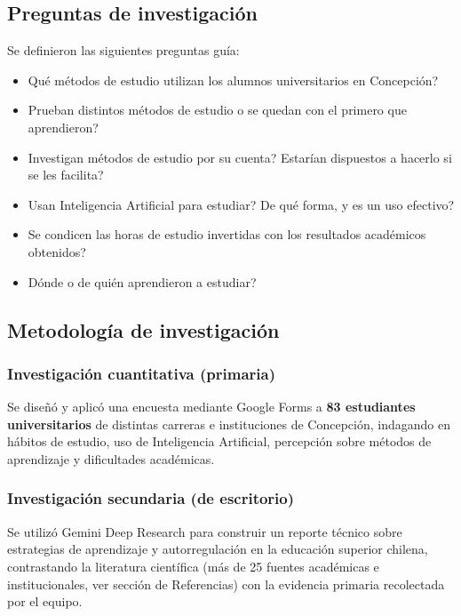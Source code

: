 \documentclass[11pt,a4paper]{article}
\begin{document}
\subsection{Preguntas de investigaci\'on}

Se definieron las siguientes preguntas gu\'ia:
\begin{itemize}[itemsep=1pt]
\item \textquestiondown Qu\'e m\'etodos de estudio utilizan los alumnos universitarios en Concepci\'on?
\item \textquestiondown Prueban distintos m\'etodos de estudio o se quedan con el primero que aprendieron?
\item \textquestiondown Investigan m\'etodos de estudio por su cuenta? \textquestiondown Estar\'ian dispuestos a hacerlo si se les facilita?
\item \textquestiondown Usan Inteligencia Artificial para estudiar? \textquestiondown De qu\'e forma, y es un uso efectivo?
\item \textquestiondown Se condicen las horas de estudio invertidas con los resultados acad\'emicos obtenidos?
\item \textquestiondown D\'onde o de qui\'en aprendieron a estudiar?
\end{itemize}

\subsection{Metodolog\'ia de investigaci\'on}

\subsubsection{Investigaci\'on cuantitativa (primaria)}
Se dise\~n\'o y aplic\'o una encuesta mediante Google Forms a \textbf{83 estudiantes universitarios} de distintas carreras e instituciones de Concepci\'on, indagando en h\'abitos de estudio, uso de Inteligencia Artificial, percepci\'on sobre m\'etodos de aprendizaje y dificultades acad\'emicas.

\subsubsection{Investigaci\'on secundaria (de escritorio)}
Se utiliz\'o Gemini Deep Research para construir un reporte t\'ecnico sobre estrategias de aprendizaje y autorregulaci\'on en la educaci\'on superior chilena, contrastando la literatura cient\'ifica (m\'as de 25 fuentes acad\'emicas e institucionales, ver secci\'on de Referencias) con la evidencia primaria recolectada por el equipo.
\end{document}
